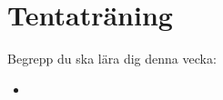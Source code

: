 \chapter{Tentaträning}\label{chapter:W14}
Begrepp du ska lära dig denna vecka:
\begin{multicols}{2}\begin{itemize}[nosep,label={$\square$},leftmargin=*]
\item\end{itemize}\end{multicols}
